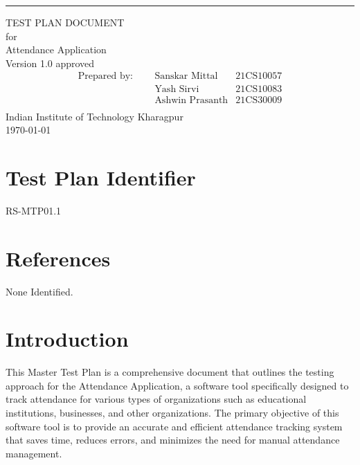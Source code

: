 \documentclass{scrreprt}
\date{}%
\def\myversion{1.0 }
\begin{document}
\begin{flushright}
    \rule{16cm}{5pt}\vskip1cm
    \begin{bfseries}
        \Huge{TEST PLAN DOCUMENT}\\
        \vspace{1cm}
        for\\
        \vspace{1cm}
        Attendance Application\\
        \vspace{1cm}
        \LARGE{Version \myversion approved}\\
        \vspace{0cm}
        \begin{align*}
        \text{Prepared by: } \;\;\;\; 
         &\text{Sanskar Mittal} &\text{21CS10057}\\
         &\text{Yash Sirvi} &\text{21CS10083}\\
         &\text{Ashwin Prasanth} &\text{21CS30009}\\
        \end{align*}
        \vspace{1.9cm}
        Indian Institute of Technology Kharagpur\\
        \vspace{1.9cm}
        \today\\
    \end{bfseries}
\end{flushright}

\tableofcontents

\pagebreak

\chapter{Test Plan Identifier}
RS-MTP01.1

\chapter{References}
None Identified.

\chapter{Introduction}
This Master Test Plan is a comprehensive document that outlines the testing approach for the Attendance Application, a software tool specifically designed to track attendance for various types of organizations such as educational institutions, businesses, and other organizations. The primary objective of this software tool is to provide an accurate and efficient attendance tracking system that saves time, reduces errors, and minimizes the need for manual attendance management.\\
\end{document}
